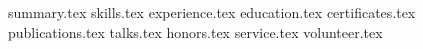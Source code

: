 \documentclass[11pt, a4paper,british]{awesome-cv}
\newcommand*{\sectiondir}{resume/}
\begin{document}
\makecvheader

{summary.tex}
{skills.tex}
{experience.tex}
{education.tex}
{certificates.tex}
{publications.tex}
{talks.tex}
{honors.tex}
{service.tex}
{volunteer.tex}
\end{document}
